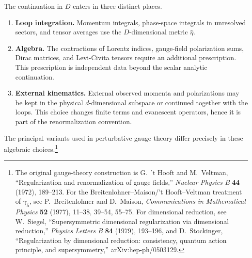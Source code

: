 The continuation in \(D\) enters in three distinct places.

\begin{enumerate}
\item \textbf{Loop integration.}  Momentum integrals, phase-space integrals
in unresolved sectors, and tensor averages use the \(D\)-dimensional metric
\(\hat\eta\).
\item \textbf{Algebra.}  The contractions of Lorentz indices, gauge-field
polarization sums, Dirac matrices, and Levi-Civita tensors require an
additional prescription.  This prescription is independent data beyond the
scalar analytic continuation.
\item \textbf{External kinematics.}  External observed momenta and
polarizations may be kept in the physical \(d\)-dimensional subspace or
continued together with the loops.  This choice changes finite terms and
evanescent operators, hence it is part of the renormalization convention.
\end{enumerate}

The principal variants used in perturbative gauge theory differ precisely in
these algebraic choices.\footnote{The original gauge-theory construction is
G.~'t Hooft and M.~Veltman, ``Regularization and renormalization of gauge
fields,'' \emph{Nuclear Physics B} \textbf{44} (1972), 189--213.  For the
Breitenlohner--Maison/'t Hooft--Veltman treatment of \(\gamma_5\), see
P.~Breitenlohner and D.~Maison, \emph{Communications in Mathematical Physics}
\textbf{52} (1977), 11--38, 39--54, 55--75.  For dimensional reduction, see
W.~Siegel, ``Supersymmetric dimensional regularization via dimensional
reduction,'' \emph{Physics Letters B} \textbf{84} (1979), 193--196, and
D.~Stockinger, ``Regularization by dimensional reduction: consistency, quantum
action principle, and supersymmetry,'' arXiv:hep-ph/0503129.}

